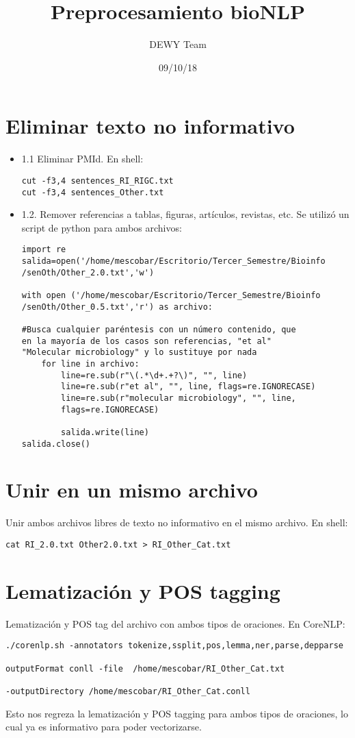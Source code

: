 \documentclass[12pt]{article}
\title{Preprocesamiento bioNLP}
\author{DEWY Team}
\date{09/10/18}
\begin{document}
\maketitle



\section{Eliminar texto no informativo}
\begin{itemize}
\item 1.1 Eliminar PMId. En shell:
\begin{verbatim}
cut -f3,4 sentences_RI_RIGC.txt
cut -f3,4 sentences_Other.txt
\end{verbatim}

\item 1.2. Remover referencias a tablas, figuras, artículos, revistas, etc.
Se utilizó un script de python para ambos archivos:
\begin{verbatim}
import re 
salida=open('/home/mescobar/Escritorio/Tercer_Semestre/Bioinfo
/senOth/Other_2.0.txt','w')

with open ('/home/mescobar/Escritorio/Tercer_Semestre/Bioinfo
/senOth/Other_0.5.txt','r') as archivo:

#Busca cualquier paréntesis con un número contenido, que 
en la mayoría de los casos son referencias, "et al" 
"Molecular microbiology" y lo sustituye por nada
    for line in archivo:
        line=re.sub(r"\(.*\d+.+?\)", "", line) 
        line=re.sub(r"et al", "", line, flags=re.IGNORECASE) 
        line=re.sub(r"molecular microbiology", "", line, 
        flags=re.IGNORECASE)
        
        salida.write(line)
salida.close()
\end{verbatim}


\end{itemize}


\section{Unir en un mismo archivo}
Unir ambos archivos libres de texto no informativo en el mismo archivo. En shell:
\begin{verbatim}
cat RI_2.0.txt Other2.0.txt > RI_Other_Cat.txt
\end{verbatim}

\section {Lematización y POS tagging}
Lematización y POS tag del archivo con ambos tipos de oraciones. En CoreNLP:


\begin{verbatim}
./corenlp.sh -annotators tokenize,ssplit,pos,lemma,ner,parse,depparse 

outputFormat conll -file  /home/mescobar/RI_Other_Cat.txt

-outputDirectory /home/mescobar/RI_Other_Cat.conll

\end{verbatim}

Esto nos regreza la lematización y POS tagging para ambos tipos de oraciones, lo cual ya es informativo para poder vectorizarse.
\end{document}
